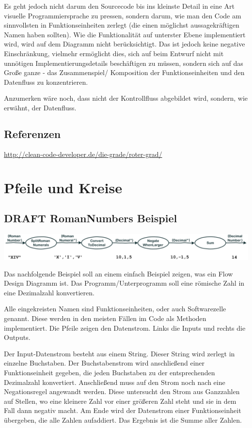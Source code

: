 \documentclass[a4paper,12pt,oneside]{book}
\begin{document}
Es geht jedoch nicht darum den Sourcecode bis ins kleinste Detail in eine Art visuelle Programmiersprache zu pressen,
sondern darum, wie man den Code am sinnvollsten in Funktionseinheiten zerlegt (die einen möglichst aussagekräftigen Namen haben sollten).
Wie die Funktionalität auf unterster Ebene implementiert wird, wird auf dem Diagramm nicht berücksichtigt.
Das ist jedoch keine negative Einschränkung, vielmehr ermöglicht dies, sich auf beim Entwurf nicht mit unnötigen Implementierungsdetails beschäftigen zu
müssen, sondern sich auf das Große ganze - das Zusammenspiel/ Komposition der Funktionseinheiten und den Datenfluss zu konzentrieren.

Anzumerken wäre noch, dass nicht der Kontrollfluss abgebildet wird, sondern, wie erwähnt, der Datenfluss.
\section{Referenzen}
\label{sec-1-5}

\url{http://clean-code-developer.de/die-grade/roter-grad/}

\chapter{Pfeile und Kreise}
\label{sec-2}
\section{DRAFT RomanNumbers Beispiel}
\label{sec-2-1}

\includegraphics[width=.9\linewidth]{./img/FromRomanNumerals.png}

Das nachfolgende Beispiel soll an einem einfach Beispiel zeigen, was ein Flow Design Diagramm ist.
Das Programm/Unterprogramm soll eine römische Zahl in eine Dezimalzahl konvertieren.

Alle eingekreisten Namen sind Funktionseinheiten, oder auch Softwarezelle genannt.
Diese werden in den meisten Fällen im Code als Methoden implementiert.
Die Pfeile zeigen den Datenstrom. Links die Inputs und rechts die Outputs.


Der Input-Datenstrom besteht aus einem String. Dieser String wird zerlegt in einzelne Buchstaben.
Der Buchstabenstrom wird anschließend einer Funktionseinheit gegeben, die jeden Buchstaben zu der entsprechenden
Dezimalzahl konvertiert. Anschließend muss auf den Strom noch nach eine Negationsregel angewandt werden. Diese untersucht den
Strom aus Ganzzahlen auf Stellen, wo eine kleinere Zahl vor einer größeren Zahl steht und sie in dem Fall dann negativ macht.
Am Ende wird der Datenstrom einer Funktionseinheit übergeben, die alle Zahlen aufaddiert.
Das Ergebnis ist die Summe aller Zahlen.
\end{document}
